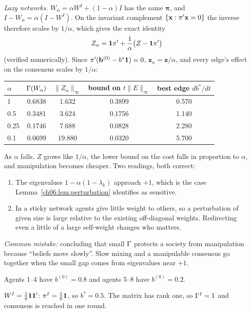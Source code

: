 \documentclass[../solutions_manual.tex]{subfiles}
\begin{document}
\emph{Lazy networks.} $W_\alpha = \alpha W^I + (1-\alpha)I$ has the same $\boldsymbol{\pi}$, and $I - W_\alpha = \alpha(I - W^I)$. On the invariant complement $\{\mathbf{x} : \pi'\mathbf{x} = 0\}$ the inverse therefore scales by $1/\alpha$, which gives the exact identity
\[
Z_\alpha = \mathbf{1}\pi' + \frac{1}{\alpha}\bigl(Z - \mathbf{1}\pi'\bigr)
\]
(verified numerically). Since $\pi'(\mathbf{b}^{(0)} - b^*\mathbf{1}) = 0$, $\mathbf{z}_\alpha = \mathbf{z}/\alpha$, and every edge's effect on the consensus scales by $1/\alpha$:
\begin{center}
\begin{tabular}{lcccc}
\toprule
$\alpha$ & $\Gamma(W_\alpha)$ & $\|Z_\alpha\|_\infty$ & bound on $t\|E\|_\infty$ & best edge $db^*/dt$ \\
\midrule
1 & 0.6838 & 1.632 & 0.3899 & 0.570 \\
0.5 & 0.3481 & 3.624 & 0.1756 & 1.140 \\
0.25 & 0.1746 & 7.688 & 0.0828 & 2.280 \\
0.1 & 0.0699 & 19.880 & 0.0320 & 5.700 \\
\bottomrule
\end{tabular}
\end{center}
As $\alpha$ falls, $Z$ grows like $1/\alpha$, the lower bound on the cost falls in proportion to $\alpha$, and manipulation becomes cheaper. Two readings, both correct:
\begin{enumerate}
\item The eigenvalues $1 - \alpha(1 - \lambda_k)$ approach $+1$, which is the case Lemma~\ref{ch06:lem:perturbation} identifies as sensitive.
\item In a sticky network agents give little weight to others, so a perturbation of given size is large relative to the existing off-diagonal weights. Redirecting even a little of a large self-weight changes who matters.
\end{enumerate}
\emph{Common mistake:} concluding that small $\Gamma$ protects a society from manipulation because ``beliefs move slowly''. Slow mixing and a manipulable consensus go together when the small gap comes from eigenvalues near $+1$.


Agents 1--4 have $b^{(0)} = 0.8$ and agents 5--8 have $b^{(0)} = 0.2$.

 $W^I = \frac18\mathbf{1}\mathbf{1}'$: $\pi^I = \frac18\mathbf{1}$, so $b^* = 0.5$. The matrix has rank one, so $\Gamma^I = 1$ and consensus is reached in one round.
\end{document}
